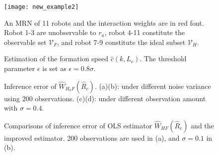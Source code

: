 \documentclass[12pt,journal,draftclsnofoot,onecolumn]{IEEEtran}
\let \sss=\scriptscriptstyle
\begin{document}
\begin{figure}[t]
  \centering 
  \setlength{\abovecaptionskip}{0.1cm}
  \texttt{[image: new\_example2]} 
  \caption{An MRN of 11 robots and the interaction weights are in red font. Robot 1-3 are unobservable to $r_a$, robot 4-11 constitute the observable set $\mathcal{V}_{\sss F}$, and robot 7-9 constitute the ideal subset $\mathcal{V}_{\sss H}$.} 
  \label{se_example}
  \vspace{-10pt}
\end{figure}


\begin{figure}[t]
\centering
\setlength{\abovecaptionskip}{-0.1cm}
\hspace{-0.7cm}
\caption{Estimation of the formation speed $\hat c(k,L_c) $. The threshold parameter $\epsilon$ is set as $\epsilon=0.8\sigma$. 
}
\label{fig:v_noise}
\vspace{-10pt}
\end{figure}

\begin{figure*}[t]
\centering
{}
\hspace{-0.6cm}
\hspace{-0.6cm}
\hspace{-0.6cm}
\vspace{-5pt}
\caption{Inference error of $\hat W_{\sss{H_0 F}}(\hat{R}_c)$. 
(a)(b): under different noise variance using 200 observations. (c)(d): under different observation amount with $\sigma=0.4$. }
\label{fig:inference_local}
\vspace*{-13pt}
\end{figure*}


\begin{figure}[t]
\centering
{}
\hspace{-0.6cm}
\vspace{-5pt}
\caption{Comparisons of inference error of OLS estimator $\hat W_{\sss{HF}}(\hat R_{c})$ and the improved estimator. 200 observations are used in (a), and $\sigma=0.1$ in (b).}
\label{fig:final_inference}
\vspace{-13pt}
\end{figure}
\end{document}
